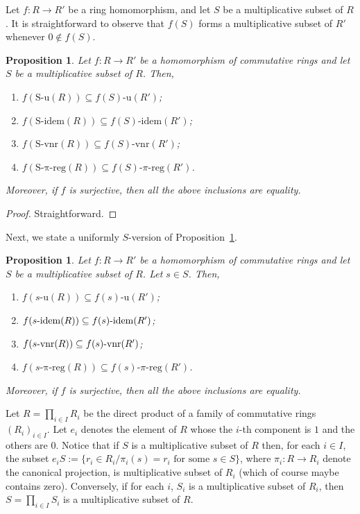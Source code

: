 \documentclass[12pt]{article}
\newtheorem{prop}[thm]{\bf Proposition}
\def\Sidem{\mathrm{S\text{-}idem}}
\def\Su{\mathrm{S\text{-}u}}
\def\Svnr{\mathrm{S\text{-}vnr}}
\def\Spreg{\mathrm{S\text{-}\pi\text{-}reg}}
\def\preg{\mathrm{\pi\text{-}reg}}
\def\u{\mathrm{u}}
\def\idem{{\rm idem}}
\def\vnr{{\rm vnr}}
\begin{document}
Let \( f : R \to R' \) be a ring homomorphism, and let \( S \) be a multiplicative subset of \( R \). It is straightforward to observe that \( f(S) \) forms a multiplicative subset of \( R' \) whenever \( 0 \notin f(S) \).


\begin{prop}\label{prop-homorphism-change-result} Let $f : R \to R'$ be a homomorphism of commutative rings and let $S$ be a multiplicative subset of $R$. Then, 
\begin{enumerate}
\item $f(\Su(R)) \subseteq f(S)\text{-}\mathrm{u}(R')$; 
\item $f(\Sidem(R)) \subseteq f(S)\text{-}\mathrm{idem}(R')$;
\item $f(\Svnr(R)) \subseteq f(S)\text{-}\mathrm{vnr}(R')$; 
\item $f(\Spreg(R)) \subseteq f(S)\text{-}\pi\text{-}\mathrm{reg}(R')$.
\end{enumerate} Moreover, if $f$ is surjective, then all the above inclusions are equality.
\end{prop} 
\begin{proof}
Straightforward.
\end{proof}

\noindent
Next, we state a uniformly \( S \)-version of Proposition~\ref{prop-homorphism-change-result}.

\begin{prop}\label{prop-homorphism-change-uni-result} Let $f : R \to R'$ be a homomorphism of commutative rings and let $S$ be a multiplicative subset of $R$. Let $s\in S$.  Then, 
\begin{enumerate}
\item $f(s\text{-}\u(R)) \subseteq f(s)\text{-}\mathrm{u}(R')$; 
\item $f(s\text{-}\idem(R)) \subseteq f(s)\text{-}\mathrm{idem}(R')$;
\item $f(s\text{-}\vnr(R)) \subseteq f(s)\text{-}\mathrm{vnr}(R')$; 
\item $f(s\text{-}\preg(R)) \subseteq f(s)\text{-}\pi\text{-}\mathrm{reg}(R')$.
\end{enumerate} Moreover, if $f$ is surjective, then all the above inclusions are equality.
\end{prop} 

Let $R = \prod_{i\in I} R_i$ be the direct product of a family of commutative rings $(R_i)_{i\in I}$. Let $e_i$ denotes the element of $R$   whose the $i$-th component is $1$ and the others are $0$. Notice that if $S$ is a multiplicative subset of $R$ then, for each $i\in I$, the subset $e_iS:=\{r_i\in R_i / \pi_i(s)=r_i \text{ for some } s\in S\}$, where $\pi_i: R\to R_i$ denote the canonical projection, is  multiplicative subset of $R_i$ (which of course maybe contains zero). Conversely,  if for each $i$, $S_i$ is a multiplicative subset of $R_i$, then $S = \prod_{i\in I} S_i$  is a multiplicative subset of $R$.  
\end{document}
